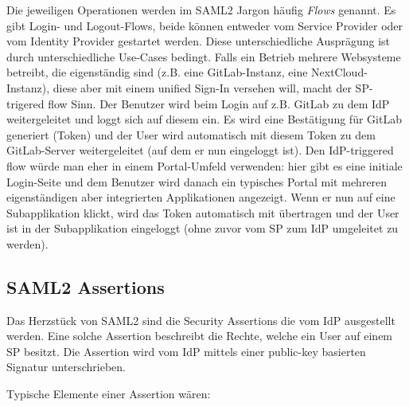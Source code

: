 Die jeweiligen Operationen werden im SAML2 Jargon häufig \textit{Flows} genannt. Es gibt Login- und Logout-Flows, beide können entweder vom Service Provider oder vom Identity Provider gestartet werden. Diese unterschiedliche Ausprägung ist durch unterschiedliche Use-Cases bedingt. Falls ein Betrieb mehrere Websysteme betreibt, die eigenständig sind (z.B. eine GitLab-Instanz, eine NextCloud-Instanz), diese aber mit einem unified Sign-In versehen will, macht der SP-trigered flow Sinn. Der Benutzer wird beim Login auf z.B. GitLab zu dem IdP weitergeleitet und loggt sich auf diesem ein. Es wird eine Bestätigung für GitLab generiert (Token) und der User wird automatisch mit diesem Token zu dem GitLab-Server weitergeleitet (auf dem er nun eingeloggt ist). Den IdP-triggered flow würde man eher in einem Portal-Umfeld verwenden: hier gibt es eine initiale Login-Seite und dem Benutzer wird danach ein typisches Portal mit mehreren eigenständigen aber integrierten Applikationen angezeigt. Wenn er nun auf eine Subapplikation klickt, wird das Token automatisch mit übertragen und der User ist in der Subapplikation eingeloggt (ohne zuvor vom SP zum IdP umgeleitet zu werden).

\subsection{SAML2 Assertions}

Das Herzstück von SAML2 sind die Security Assertions die vom IdP ausgestellt werden. Eine solche Assertion beschreibt die Rechte, welche ein User auf einem SP besitzt. Die Assertion wird vom IdP mittels einer public-key basierten Signatur unterschrieben.

Typische Elemente einer Assertion wären:

